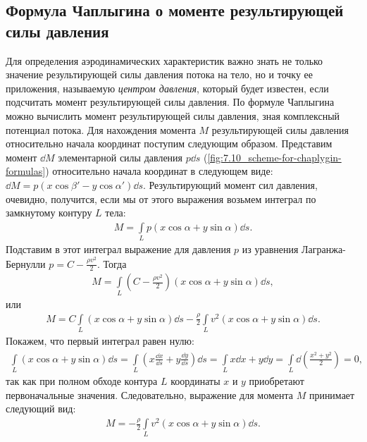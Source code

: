 	\subsection{Формула Чаплыгина о моменте результирующей силы давления}
	Для определения аэродинамических характеристик важно знать не только значение результирующей силы давления потока на тело, но и точку ее приложения, называемую \textit{центром давления}, который будет известен, если подсчитать момент результирующей силы давления.\n
	По формуле Чаплыгина можно вычислить момент результирующей силы давления, зная комплексный потенциал потока. Для нахождения момента $M$ результирующей силы давления относительно начала координат поступим следующим образом.\n
	Представим момент $\dd M$ элементарной силы давления $p\dd s$ (\cref{fig:7.10_scheme-for-chaplygin-formulas}) относительно начала координат в следующем виде: $\dd M = p\left(x\cos\beta' - y\cos\alpha'\right)\dd s$. Результирующий момент сил давления, очевидно, получится, если мы от этого выражения возьмем интеграл по замкнутому контуру $L$ тела:
	\begin{gather}\label{eq:737}
		M = \int\limits_L p\left(x\cos\alpha + y\sin\alpha\right)\dd s.
	\end{gather}\n
	Подставим в этот интеграл выражение для давления $p$ из уравнения Лагранжа-Бернулли $p = C - \frac{\rho v^2}{2}$. Тогда
	\begin{gather*}
		M = \int\limits_L\left(C - \frac{\rho v^2}{2}\right)\left(x\cos\alpha + y\sin\alpha\right)\dd s,
	\end{gather*}
	или
	\begin{gather*}
		M = C\int\limits_L\left(x\cos\alpha + y\sin\alpha\right)\dd s - \frac{\rho}{2}\int\limits_L v^2\left(x\cos\alpha + y\sin\alpha\right)\dd s.
	\end{gather*}\n
	Покажем, что первый интеграл равен нулю:
	\begin{gather*}
		\int\limits_L\left(x\cos\alpha + y\sin\alpha\right)\dd s = \int\limits_L\left(x\frac{\dd x}{\dd s} + y\frac{\dd y}{\dd s}\right)\dd s = \int\limits_L x\dd x + y\dd y = \int\limits_L\dd\left(\frac{x^2 + y^2}{2}\right) = 0,
	\end{gather*}
	так как при полном обходе контура $L$ координаты $x$ и $y$ приобретают первоначальные значения. Следовательно, выражение для момента $M$ принимает следующий вид:
	\begin{gather}\label{eq:738}
		M = -\frac{\rho}{2}\int\limits_L v^2\left(x\cos\alpha + y\sin\alpha\right)\dd s.
	\end{gather}\n
